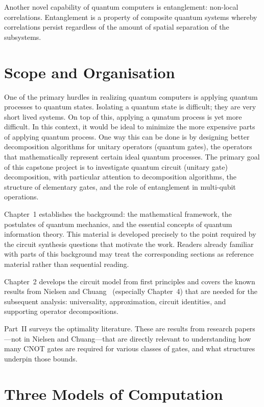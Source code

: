 \documentclass[12pt, a4paper, oneside]{report}
\theoremstyle{plain}
\theoremstyle{definition}
\theoremstyle{remark}
\begin{document}
Another novel capability of quantum computers is entanglement: non-local correlations. Entanglement is a property of composite quantum systems whereby correlations persist regardless of the amount of spatial separation of the subsystems.



\section{Scope and Organisation}

One of the primary hurdles in realizing quantum computers is applying quantum processes to quantum states. Isolating a quantum state is difficult; they are very short lived systems. On top of this, applying a qunatum process is yet more difficult. In this context, it would be ideal to minimize the more expensive parts of applying  quantum process. One way this can be done is by designing better decomposition algorithms for unitary operators (quantum gates), the operators that mathematically represent certain ideal quantum processes. The primary goal of this capstone project is to investigate quantum circuit (unitary gate) decomposition,
with particular attention to decomposition algorithms, the structure of elementary gates, and
the role of entanglement in multi-qubit operations.

Chapter~1 establishes the background: the mathematical framework, the postulates of quantum
mechanics, and the essential concepts of quantum information theory. This material is
developed precisely to the point required by the circuit synthesis questions that motivate
the work. Readers already familiar with parts of this background may treat the corresponding
sections as reference material rather than sequential reading.

Chapter~2 develops the circuit model from first principles and covers the known results from
Nielsen and Chuang~\cite{nielsen2000} (especially Chapter~4) that are needed for the
subsequent analysis: universality, approximation, circuit identities, and supporting operator
decompositions.

Part~II surveys the optimality literature. These are results from research papers---not in
Nielsen and Chuang---that are directly relevant to understanding how many CNOT gates are
required for various classes of gates, and what structures underpin those bounds.



\section{Three Models of Computation}
\end{document}
